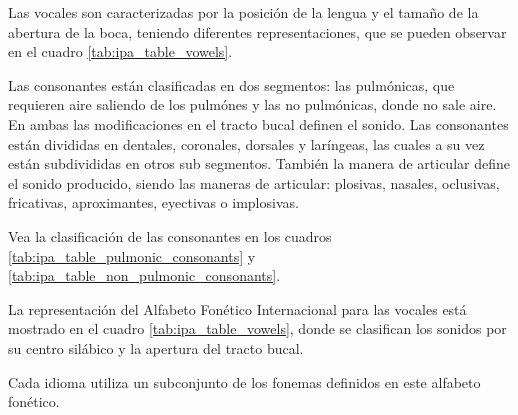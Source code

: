 Las vocales son caracterizadas por la posición de la lengua y el tamaño de la abertura de la boca, teniendo diferentes representaciones, que se pueden observar en el cuadro \ref{tab:ipa_table_vowels}. 

Las consonantes están clasificadas en dos segmentos: las pulmónicas, que requieren aire saliendo de los pulmónes y las no pulmónicas, donde no sale aire. En ambas las modificaciones en el tracto bucal definen el sonido. Las consonantes están divididas en dentales, coronales, dorsales y laríngeas, las cuales a su vez están subdivididas en otros sub segmentos. También la manera de articular define el sonido producido, siendo las maneras de articular: plosivas, nasales, oclusivas, fricativas, aproximantes, eyectivas o implosivas.

Vea la clasificación de las consonantes en los cuadros \ref{tab:ipa_table_pulmonic_consonants} y \ref{tab:ipa_table_non_pulmonic_consonants}.

La representación del Alfabeto Fonético Internacional para las vocales está mostrado en el cuadro \ref{tab:ipa_table_vowels}, donde se clasifican los sonidos por su centro silábico y la apertura del tracto bucal.


%
%
%

Cada idioma utiliza un subconjunto de los fonemas definidos en este alfabeto fonético.

